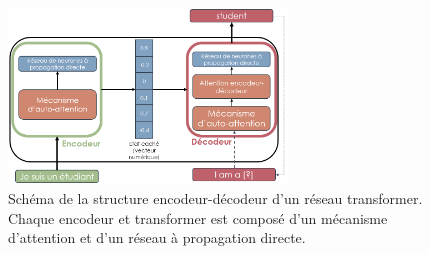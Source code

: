 \begin{figure}[!ht]
 \centering
 \includegraphics[width=0.66\textwidth]{figures/encoder_attention.png}
 \caption[Schéma de la structure encodeur-décodeur d'un réseau transformer]{Schéma de la structure encodeur-décodeur d'un réseau transformer. Chaque encodeur et transformer est composé d'un mécanisme d'attention et d'un réseau à propagation directe.}
 \label{fig:encoder_attention}
\end{figure}

